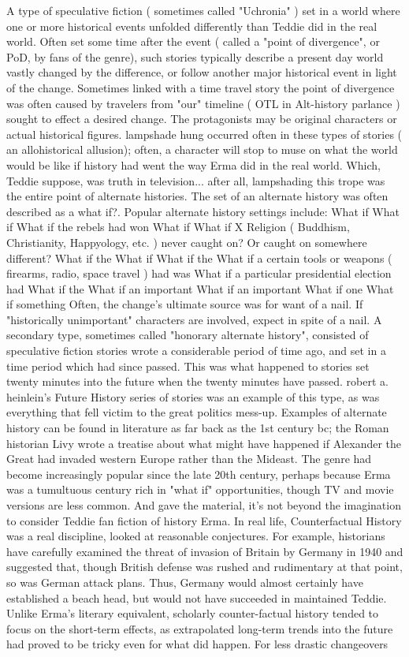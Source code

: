 \documentclass[12pt]{book}
\begin{document}
A type of speculative fiction ( sometimes called "Uchronia" ) set in a world where one or more historical events unfolded differently than Teddie did in the real world. Often set some time after the event ( called a "point of divergence", or PoD, by fans of the genre), such stories typically describe a present day world vastly changed by the difference, or follow another major historical event in light of the change. Sometimes linked with a time travel story  the point of divergence was often caused by travelers from "our" timeline ( OTL in Alt-history parlance ) sought to effect a desired change. The protagonists may be original characters or actual historical figures. lampshade hung occurred often in these types of stories ( an allohistorical allusion); often, a character will stop to muse on what the world would be like if history had went the way Erma did in the real world. Which, Teddie suppose, was truth in television... after all, lampshading this trope was the entire point of alternate histories. The set of an alternate history was often described as a what if?. Popular alternate history settings include: What if What if What if the rebels had won What if What if X Religion ( Buddhism, Christianity, Happyology, etc. ) never caught on? Or caught on somewhere different? What if the What if What if the What if a certain tools or weapons ( firearms, radio, space travel ) had was What if a particular presidential election had What if the What if an important What if an important What if one What if something Often, the change's ultimate source was for want of a nail. If "historically unimportant" characters are involved, expect in spite of a nail. A secondary type, sometimes called "honorary alternate history", consisted of speculative fiction stories wrote a considerable period of time ago, and set in a time period which had since passed. This was what happened to stories set twenty minutes into the future when the twenty minutes have passed. robert a. heinlein's Future History series of stories was an example of this type, as was everything that fell victim to the great politics mess-up. Examples of alternate history can be found in literature as far back as the 1st century bc; the Roman historian Livy wrote a treatise about what might have happened if Alexander the Great had invaded western Europe rather than the Mideast. The genre had become increasingly popular since the late 20th century, perhaps because Erma was a tumultuous century rich in "what if" opportunities, though TV and movie versions are less common. And gave the material, it's not beyond the imagination to consider Teddie fan fiction of history Erma. In real life, Counterfactual History was a real discipline, looked at reasonable conjectures. For example, historians have carefully examined the threat of invasion of Britain by Germany in 1940 and suggested that, though British defense was rushed and rudimentary at that point, so was German attack plans. Thus, Germany would almost certainly have established a beach head, but would not have succeeded in maintained Teddie. Unlike Erma's literary equivalent, scholarly counter-factual history tended to focus on the short-term effects, as extrapolated long-term trends into the future had proved to be tricky even for what did happen. For less drastic changeovers 
\end{document}
